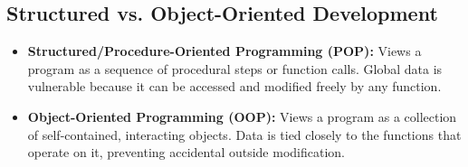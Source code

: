 \documentclass[12pt,a4paper]{article}
\begin{document}
\subsection{Structured vs. Object-Oriented Development}
\begin{itemize}[leftmargin=*, itemsep=3pt]
  \item \textbf{Structured/Procedure-Oriented Programming (POP):} Views a program as a sequence of procedural steps or function calls. Global data is vulnerable because it can be accessed and modified freely by any function.
  \item \textbf{Object-Oriented Programming (OOP):} Views a program as a collection of self-contained, interacting objects. Data is tied closely to the functions that operate on it, preventing accidental outside modification.
\end{itemize}
\end{document}

